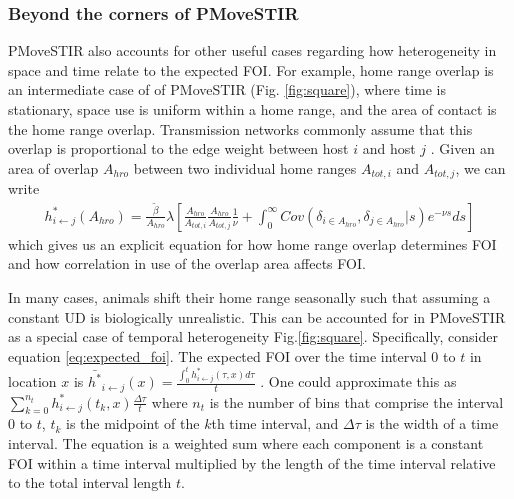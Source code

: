 \documentclass[letterpaper]{article}
\begin{document}
\subsubsection*{Beyond the corners of PMoveSTIR}

PMoveSTIR also accounts for other useful cases regarding how heterogeneity in space and time relate to the expected FOI. For example, home range overlap is an intermediate case of of PMoveSTIR (Fig. \ref{fig:square}), where time is stationary, space use is uniform within a home range, and the area of contact is the home range overlap.  
Transmission networks commonly assume that this overlap is proportional to the edge weight between host $i$ and host $j$ \citep[e.g.][]{Springer2017a}. 
Given an area of overlap $A_{hro}$ between two individual home ranges $A_{tot, i}$ and $A_{tot, j}$, we can write
\begin{equation}
    \begin{aligned}
    h^*_{i \leftarrow j}(A_{hro}) = \frac{\tilde{\beta}}{A_{hro}} \lambda \left[\frac{A_{hro}}{A_{tot, i}} \frac{A_{hro}}{A_{tot, j}}  \frac{1}{\nu} + \int_{0}^{\infty} Cov(\delta_{i \in A_{hro}}, \delta_{j \in A_{hro}} | s) e^{-\nu s} ds\right]
    \end{aligned}
    \label{eq:home_range}
\end{equation}
which gives us an explicit equation for how home range overlap determines FOI and how correlation in use of the overlap area affects FOI. 

In many cases, animals shift their home range seasonally \citep{Viana2018,Richard2014} such that assuming a constant UD is biologically unrealistic. This can be accounted for in PMoveSTIR as a special case of temporal heterogeneity Fig.\ref{fig:square}.  Specifically, consider equation \ref{eq:expected_foi}. The expected FOI over the time interval 0 to $t$ in location $x$ is $\bar{h^*}_{i \leftarrow j}(x) = \frac{\int_0^t h^*_{i \leftarrow j}(\tau, x) d\tau}{t}$ \citep{Wilber2022}.  One could approximate this as $\sum_{k = 0}^{n_t} h^*_{i \leftarrow j}(t_k, x) \frac{\Delta \tau}{t}$ where $n_t$ is the number of bins that comprise the interval 0 to $t$, $t_k$ is the midpoint of the $k$th time interval, and $\Delta \tau$ is the width of a time interval.  The equation is a weighted sum where each component is a constant FOI within a time interval multiplied by the length of the time interval relative to the total interval length $t$.  
\end{document}
